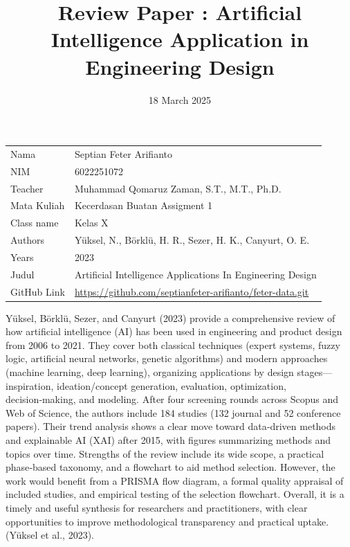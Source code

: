\documentclass{article}
\title{Review Paper : Artificial Intelligence Application in Engineering Design 
}
\date{18 March 2025}
\begin{document}
\maketitle


\noindent\begin{tabular}{l @{ : } l}
        Nama                &  Septian Feter Arifianto \\  
        NIM                 &  6022251072 \\  
        Teacher             &  Muhammad Qomaruz Zaman, S.T., M.T., Ph.D.\\
        Mata Kuliah         &  Kecerdasan Buatan Assigment 1 \\
\vspace{0,2cm}
        Class name          &  Kelas X\\
        Authors             & Yüksel, N., Börklü, H. R., Sezer, H. K., Canyurt, O. E. \\
        Years              & 2023 \\
        Judul               & Artificial Intelligence Applications In Engineering Design \\
        GitHub Link & \url{https://github.com/septianfeter-arifianto/feter-data.git}\\
\end{tabular}
\vspace{1cm}

Yüksel, Börklü, Sezer, and Canyurt (2023) provide a comprehensive review of how artificial intelligence (AI) has been used in engineering and product design from 2006 to 2021. They cover both classical techniques (expert systems, fuzzy logic, artificial neural networks, genetic algorithms) and modern approaches (machine learning, deep learning), organizing applications by design stages—inspiration, ideation/concept generation, evaluation, optimization, decision‑making, and modeling. After four screening rounds across Scopus and Web of Science, the authors include 184 studies (132 journal and 52 conference papers). Their trend analysis shows a clear move toward data‑driven methods and explainable AI (XAI) after 2015, with figures summarizing methods and topics over time. Strengths of the review include its wide scope, a practical phase‑based taxonomy, and a flowchart to aid method selection. However, the work would benefit from a PRISMA flow diagram, a formal quality appraisal of included studies, and empirical testing of the selection flowchart. Overall, it is a timely and useful synthesis for researchers and practitioners, with clear opportunities to improve methodological transparency and practical uptake. (Yüksel et al., 2023).
\end{document}
